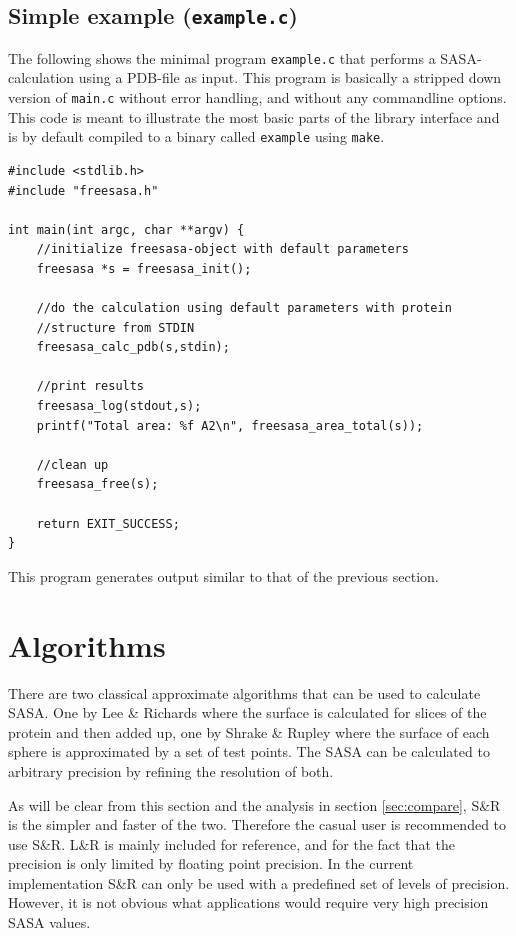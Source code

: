 \documentclass[a4paper,11pt]{article}
\begin{document}
\subsection{Simple example (\texttt{example.c})}\label{sec:simple_sample}

The following shows the minimal program \verb|example.c| that performs
a SASA-calculation using a PDB-file as input. This program is
basically a stripped down version of \verb|main.c| without error
handling, and without any commandline options. This code is meant to
illustrate the most basic parts of the library interface and is by
default compiled to a binary called \verb|example| using \verb|make|.

\begin{verbatim}
#include <stdlib.h>
#include "freesasa.h"

int main(int argc, char **argv) { 
    //initialize freesasa-object with default parameters
    freesasa *s = freesasa_init();

    //do the calculation using default parameters with protein
    //structure from STDIN
    freesasa_calc_pdb(s,stdin);

    //print results
    freesasa_log(stdout,s);
    printf("Total area: %f A2\n", freesasa_area_total(s));

    //clean up
    freesasa_free(s);

    return EXIT_SUCCESS;
}
\end{verbatim}
This program generates output similar to that of the previous
section.

\section{Algorithms}\label{sec:alg}

There are two classical approximate algorithms that can be used to
calculate SASA. One by Lee \& Richards \cite{LnR} where the surface is
calculated for slices of the protein and then added up, one by Shrake
\& Rupley \cite{SnR} where the surface of each sphere is approximated
by a set of test points. The SASA can be calculated to arbitrary
precision by refining the resolution of both.

As will be clear from this section and the analysis in section
\ref{sec:compare}, S\&R is the simpler and faster of the
two. Therefore the casual user is recommended to use S\&R. L\&R is
mainly included for reference, and for the fact that the precision is
only limited by floating point precision. In the current
implementation S\&R can only be used with a predefined set of levels
of precision. However, it is not obvious what applications would
require very high precision SASA values.
\end{document}
